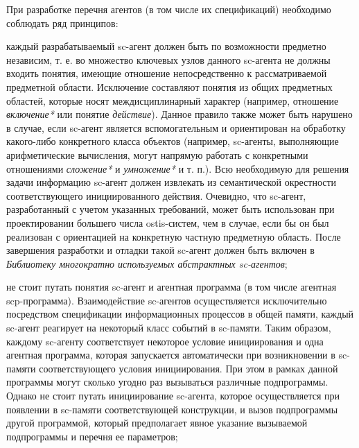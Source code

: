 \begin{SCn}
{\begin{scnitemize}
При разработке перечня агентов (в том числе их спецификаций) необходимо соблюдать ряд принципов:

\begin{scnitemizeii}
\item каждый разрабатываемый sc-агент должен быть по возможности предметно независим, т. е. во множество ключевых узлов данного sc-агента не должны входить понятия, имеющие отношение непосредственно к рассматриваемой предметной области. Исключение составляют понятия из общих предметных областей, которые носят междисциплинарный характер (например, отношение \textit{включение*} или понятие \textit{действие}). Данное правило также может быть нарушено в случае, если sc-агент является вспомогательным и ориентирован на обработку какого-либо конкретного класса объектов (например, sc-агенты, выполняющие арифметические вычисления, могут напрямую работать с конкретными отношениями \textit{сложение*} и \textit{умножение*} и т. п.). Всю необходимую для решения задачи информацию sc-агент должен извлекать из семантической окрестности соответствующего инициированного действия. Очевидно, что sc-агент, разработанный с учетом указанных требований, может быть использован при проектировании большего числа ostis-систем, чем в случае, если бы он был реализован с ориентацией на конкретную частную предметную область. После завершения разработки и отладки такой sc-агент должен быть включен в \textit{Библиотеку многократно используемых абстрактных sc-агентов};

\item не стоит путать понятия sc-агент и агентная программа (в том числе агентная scp-программа). Взаимодействие sc-агентов осуществляется исключительно посредством спецификации информационных процессов в общей памяти, каждый sc-агент реагирует на некоторый класс событий в sc-памяти. Таким образом, каждому sc-агенту соответствует некоторое условие инициирования и одна агентная программа, которая запускается автоматически при возникновении в sc-памяти соответствующего условия инициирования. При этом в рамках данной программы могут сколько угодно раз вызываться различные подпрограммы. Однако не стоит путать инициирование sc-агента, которое осуществляется при появлении в sc-памяти соответствующей конструкции, и вызов подпрограммы другой программой, который предполагает явное указание вызываемой подпрограммы и перечня ее параметров;


\end{scnitemizeii}
\end{scnitemize}}
\end{SCn}
